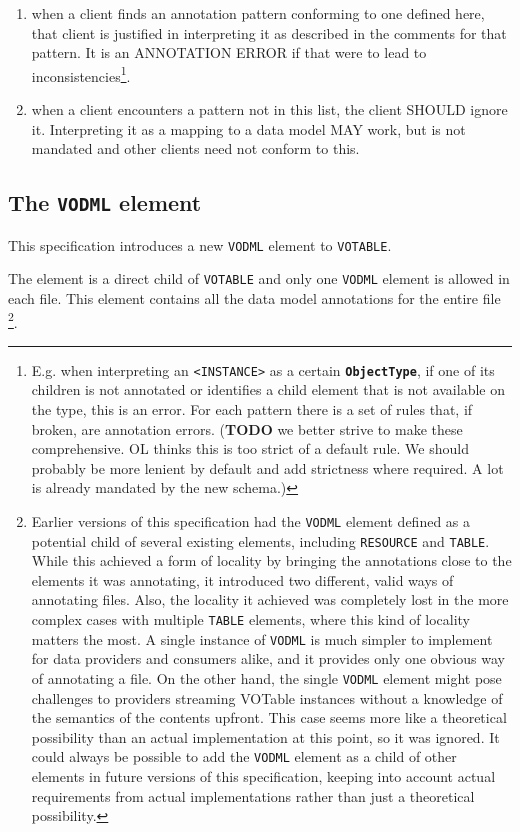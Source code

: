 \documentclass[11pt,a4paper]{ivoa}
\begin{document}
\begin{enumerate}
\def\labelenumi{\arabic{enumi}.}
\itemsep1pt\parskip0pt
\item
  when a client finds an annotation pattern conforming to one defined
  here, that client is justified in interpreting it as described in the
  comments for that pattern. It is an ANNOTATION ERROR if that were to
  lead to inconsistencies\footnote{E.g. when interpreting an
    \texttt{\textless{}INSTANCE\textgreater{}} as a certain
    \textbf{\texttt{ObjectType}}, if one of its children is not
    annotated or identifies a child element that is not available on the
    type, this is an error. For each pattern there is a set of rules
    that, if broken, are annotation errors. (\textbf{TODO} we better
    strive to make these comprehensive. OL thinks this is too strict of
    a default rule. We should probably be more lenient by default and
    add strictness where required. A lot is already mandated by the new
    schema.)}.
\item
  when a client encounters a pattern not in this list, the client SHOULD
  ignore it. Interpreting it as a mapping to a data model MAY work, but
  is not mandated and other clients need not conform to this.
\end{enumerate}

\subsection{The \texttt{VODML} element}\label{sec:norm-vodml}

This specification introduces a new \texttt{VODML} element to
\texttt{VOTABLE}.

The element is a direct child of \texttt{VOTABLE} and only one
\texttt{VODML} element is allowed in each file. This element contains
all the data model annotations for the entire file \footnote{Earlier
  versions of this specification had the \texttt{VODML} element defined
  as a potential child of several existing elements, including
  \texttt{RESOURCE} and \texttt{TABLE}. While this achieved a form of
  locality by bringing the annotations close to the elements it was
  annotating, it introduced two different, valid ways of annotating
  files. Also, the locality it achieved was completely lost in the more
  complex cases with multiple \texttt{TABLE} elements, where this kind
  of locality matters the most. A single instance of \texttt{VODML} is
  much simpler to implement for data providers and consumers alike, and
  it provides only one obvious way of annotating a file. On the other
  hand, the single \texttt{VODML} element might pose challenges to
  providers streaming VOTable instances without a knowledge of the
  semantics of the contents upfront. This case seems more like a
  theoretical possibility than an actual implementation at this point,
  so it was ignored. It could always be possible to add the
  \texttt{VODML} element as a child of other elements in future versions
  of this specification, keeping into account actual requirements from
  actual implementations rather than just a theoretical possibility.}.
\end{document}
